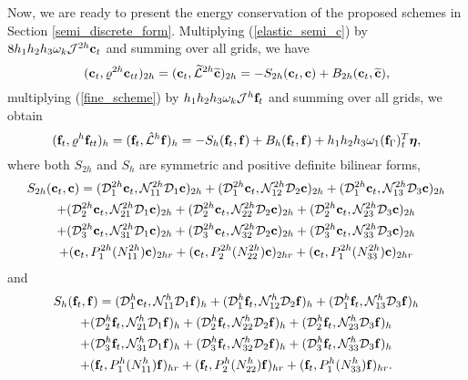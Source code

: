  Now, we are ready to present the energy conservation of the proposed schemes in Section \ref{semi_discrete_form}. Multiplying (\ref{elastic_semi_c}) by $8h_1h_2h_3\omega_k{\mathcal J}^{2h}{\bf c}_t$ and summing over all grids, we have
\begin{equation}\label{coarse_simple}
({\bf c}_t, {\varrho}^{2h}{\bf c}_{tt})_{2h} = ({\bf c}_t,\wt{\mathcal{L}}^{2h}\wt{{\bf c}})_{2h} = -S_{2h}({\bf c}_t,{\bf c}) + B_{2h}({\bf c}_t,\wt{{\bf c}}),
\end{equation}
multiplying (\ref{fine_scheme}) by $h_1h_2h_3\omega_k{\mathcal J}^h{\bf f}_t$ and summing over all grids, we obtain
\begin{equation*}
({\bf f}_t, {\varrho}^h{\bf f}_{tt})_h = ({\bf f}_t,\hat{\mathcal{L}}^h{\bf f})_h = -S_h({\bf f}_t,{\bf f}) + B_h({\bf f}_t,{\bf f}) 
+h_1h_2h_3\omega_1({\bf f}_\Gamma)_t^T{\bm \eta},
\end{equation*}
where  both $S_{2h}$ and $S_h$ are symmetric and positive definite bilinear forms, 
\begin{multline*}
S_{2h}({\bf c}_t,{\bf c}) = (\mathcal{D}_1^{2h}{\bf c}_t,\mathcal{N}_{11}^{2h}\mathcal{D}_1{\bf c})_{2h} +  (\mathcal{D}_1^{2h}{\bf c}_t,\mathcal{N}_{12}^{2h}\mathcal{D}_2{\bf c})_{2h} +  (\mathcal{D}_1^{2h}{\bf c}_t,\mathcal{N}_{13}^{2h}\mathcal{D}_3{\bf c})_{2h}\\
 +  (\mathcal{D}_2^{2h}{\bf c}_t,\mathcal{N}_{21}^{2h}\mathcal{D}_1{\bf c})_{2h} 
+  (\mathcal{D}_2^{2h}{\bf c}_t,\mathcal{N}_{22}^{2h}\mathcal{D}_2{\bf c})_{2h} +  (\mathcal{D}_2^{2h}{\bf c}_t,\mathcal{N}_{23}^{2h}\mathcal{D}_3{\bf c})_{2h} \\
+  (\mathcal{D}_3^{2h}{\bf c}_t,\mathcal{N}_{31}^{2h}\mathcal{D}_1{\bf c})_{2h} 
+  (\mathcal{D}_3^{2h}{\bf c}_t,\mathcal{N}_{32}^{2h}\mathcal{D}_2{\bf c})_{2h} +  (\mathcal{D}_3^{2h}{\bf c}_t,\mathcal{N}_{33}^{2h}\mathcal{D}_3{\bf c})_{2h}\\
+ ({\bf c}_t, P^{2h}_1(N_{11}^{2h}){\bf c})_{2hr} + ({\bf c}_t, P^{2h}_2(N_{22}^{2h}){\bf c})_{2hr} + ({\bf c}_t, P^{2h}_1(N_{33}^{2h}){\bf c})_{2hr}
\end{multline*}
and 
\begin{multline*}
S_{h}({\bf f}_t,{\bf f}) = (\mathcal{D}_1^{h}{\bf c}_t,\mathcal{N}_{11}^{h}\mathcal{D}_1{\bf f})_{h} +  (\mathcal{D}_1^{h}{\bf f}_t,\mathcal{N}_{12}^{h}\mathcal{D}_2{\bf f})_{h} +  (\mathcal{D}_1^{h}{\bf f}_t,\mathcal{N}_{13}^{h}\mathcal{D}_3{\bf f})_{h}\\
+  (\mathcal{D}_2^{h}{\bf f}_t,\mathcal{N}_{21}^{h}\mathcal{D}_1{\bf f})_{h} 
+  (\mathcal{D}_2^{h}{\bf f}_t,\mathcal{N}_{22}^{h}\mathcal{D}_2{\bf f})_{h} +  (\mathcal{D}_2^{h}{\bf f}_t,\mathcal{N}_{23}^{h}\mathcal{D}_3{\bf f})_{h} \\
+  (\mathcal{D}_3^{h}{\bf f}_t,\mathcal{N}_{31}^{h}\mathcal{D}_1{\bf f})_{h} 
+  (\mathcal{D}_3^{h}{\bf f}_t,\mathcal{N}_{32}^{h}\mathcal{D}_2{\bf f})_{h} +  (\mathcal{D}_3^{h}{\bf f}_t,\mathcal{N}_{33}^{h}\mathcal{D}_3{\bf f})_{h}\\
+ ({\bf f}_t, P^{h}_1(N_{11}^h){\bf f})_{hr} + ({\bf f}_t, P^{h}_2(N_{22}^h){\bf f})_{hr} + ({\bf f}_t, P^{h}_1(N_{33}^h){\bf f})_{hr}.
\end{multline*}
